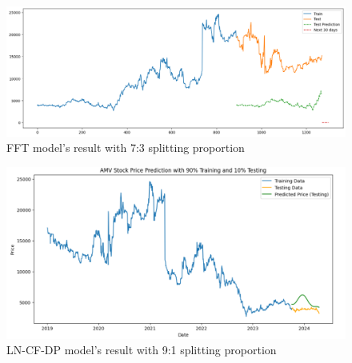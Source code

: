 \documentclass{ieeeojies}
\begin{document}
\begin{figure}[H]
  \centering
  \begin{minipage}{0.8\linewidth}
    \centering
    \includegraphics[width=\linewidth]{bibliography/Figure/AMV_FFT.png}
    \caption{FFT model's result with 7:3 splitting proportion}
    \label{fig8}
  \end{minipage}
\end{figure}

\begin{figure}[H]
  \centering
  \begin{minipage}{0.8\linewidth}
    \centering
    \includegraphics[width=\linewidth]{bibliography/Figure/AMV_LN_CF&DP.png}
    \caption{LN-CF-DP model's result with 9:1 splitting proportion}
    \label{fig8}
  \end{minipage}
\end{figure}
\end{document}

